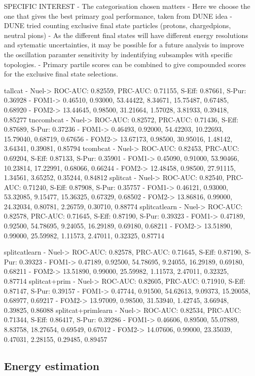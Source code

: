 SPECIFIC INTEREST
- The categorisation chosen matters
- Here we choose the one that gives the best primary goal performance, taken from DUNE idea
- DUNE tried counting exclusive final state particles (protons, chargedpions, neutral pions)
- As the different final states will have different energy resolutions and sytematic
uncertainties, it may be possible for a future analysis to improve the oscillation paramter
sensitivity by indentifying subsamples with specific topologies.
- Primary partile scores can be combined to give compounded scores for the exclusive final state
selections.

tallcat
- Nuel-> ROC-AUC: 0.82559, PRC-AUC: 0.71155, S-Eff: 0.87661, S-Pur: 0.36928
- FOM1-> 0.46510, 0.93000, 53.44422, 8.34671, 15.75487, 0.67485, 0.68920
- FOM2-> 13.44645, 0.98500, 31.21664, 1.57028, 3.81933, 0.39418, 0.85277
tnccombcat
- Nuel-> ROC-AUC: 0.82572, PRC-AUC: 0.71436, S-Eff: 0.87689, S-Pur: 0.37236
- FOM1-> 0.46493, 0.92000, 54.42203, 10.22693, 15.79040, 0.68719, 0.67656
- FOM2-> 13.67173, 0.98500, 30.95016, 1.48142, 3.64341, 0.39081, 0.85794
tcombcat
- Nuel-> ROC-AUC: 0.82453, PRC-AUC: 0.69204, S-Eff: 0.87133, S-Pur: 0.35901
- FOM1-> 0.45090, 0.91000, 53.90466, 10.23814, 17.22991, 0.68066, 0.66244
- FOM2-> 12.48458, 0.98500, 27.91115, 1.34561, 3.65252, 0.35244, 0.84812
splitcat
- Nuel-> ROC-AUC: 0.82540, PRC-AUC: 0.71240, S-Eff: 0.87908, S-Pur: 0.35757
- FOM1-> 0.46121, 0.93000, 53.32085, 9.15477, 15.36325, 0.67329, 0.68502
- FOM2-> 13.86816, 0.99000, 24.32034, 0.80781, 2.26759, 0.30710, 0.88774
splitcatlearn
- Nuel-> ROC-AUC: 0.82578, PRC-AUC: 0.71645, S-Eff: 0.87190, S-Pur: 0.39323
- FOM1-> 0.47189, 0.92500, 54.78695, 9.24055, 16.29189, 0.69180, 0.68211
- FOM2-> 13.51890, 0.99000, 25.59982, 1.11573, 2.47011, 0.32325, 0.87714

splitcatlearn
- Nuel-> ROC-AUC: 0.82578, PRC-AUC: 0.71645, S-Eff: 0.87190, S-Pur: 0.39323
- FOM1-> 0.47189, 0.92500, 54.78695, 9.24055, 16.29189, 0.69180, 0.68211
- FOM2-> 13.51890, 0.99000, 25.59982, 1.11573, 2.47011, 0.32325, 0.87714
splitcat+prim
- Nuel-> ROC-AUC: 0.82605, PRC-AUC: 0.71910, S-Eff: 0.87147, S-Pur: 0.39157
- FOM1-> 0.47744, 0.91500, 54.62613, 9.09373, 15.20058, 0.68977, 0.69217
- FOM2-> 13.97009, 0.98500, 31.53940, 1.42745, 3.66948, 0.39825, 0.86088
splitcat+primlearn
- Nuel-> ROC-AUC: 0.82534, PRC-AUC: 0.71344, S-Eff: 0.86417, S-Pur: 0.39286
- FOM1-> 0.46606, 0.89500, 55.07889, 8.83758, 18.27654, 0.69549, 0.67012
- FOM2-> 14.07606, 0.99000, 23.35039, 0.47031, 2.28155, 0.29485, 0.89457

\subsection{Energy estimation} %
\label{sec:cvn_specific_energy} %

